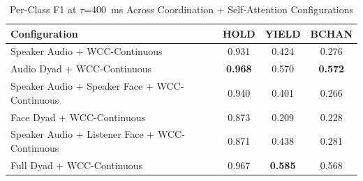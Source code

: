 \begin{table}[h]
\caption{Per-Class F1 at $\tau$=400~ms Across Coordination + Self-Attention Configurations}
\label{tab:f1_per_class_csa}
\small
\renewcommand{\arraystretch}{1.20}
\begin{tabular}{>{\raggedright\arraybackslash}p{4cm}ccc}
\toprule
Configuration & HOLD & YIELD & BCHAN \\
\midrule
Speaker Audio + WCC-Continuous & 0.931 & 0.424 & 0.276 \\
Audio Dyad + WCC-Continuous & \textbf{0.968} & 0.570 & \textbf{0.572} \\
Speaker Audio + Speaker Face + WCC-Continuous & 0.940 & 0.401 & 0.266 \\
Face Dyad + WCC-Continuous & 0.873 & 0.209 & 0.228 \\
Speaker Audio + Listener Face + WCC-Continuous & 0.871 & 0.438 & 0.281 \\
Full Dyad + WCC-Continuous & 0.967 & \textbf{0.585} & 0.568 \\
\bottomrule
\end{tabular}
\end{table}
